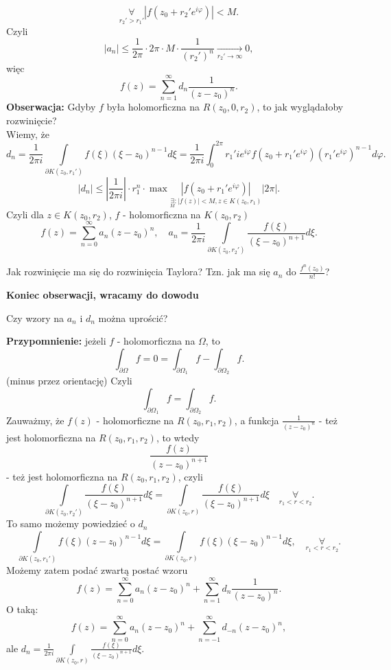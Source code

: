 \documentclass[../main.tex]{subfiles}
\begin{document}
\[
    \underset{r_2' > r_1'}{\forall} \left| f(z_0+r_2'e^{i\varphi}) \right| < M
.\]
Czyli
\[
    |a_n| \le \frac{1}{2\pi} \cdot 2\pi \cdot M \cdot \frac{1}{(r_2')^n} \underset{r_2'\to \infty}{\longrightarrow} 0
,\]
więc
\[
    f(z) = \sum_{n=1}^{\infty} d_n \frac{1}{(z-z_0)^n}
.\]
\textbf{Obserwacja:} Gdyby $f$ była holomorficzna na $R(z_0,0,r_2)$, to jak wyglądałoby rozwinięcie?\\
Wiemy, że
\[
    d_n = \frac{1}{2\pi i}\int\limits_{ \partial K(z_0,r_1')} f(\xi)(\xi - z_0)^{n-1}d\xi = \frac{1}{2\pi i}\int_{0}^{2\pi} r_1'ie^{i\varphi}f(z_0+r_1'e^{i\varphi})(r_1'e^{i\varphi})^{n-1}d\varphi
.\]
\[
    |d_n| \le \left| \frac{1}{2\pi i} \right| \cdot r_1^{n} \cdot  \max \underset{\underset{M}{\exists}: |f(z)| < M, z\in K(z_0,r_1)}{\left| f(z_0 + r_1'e^{i\varphi}) \right| }|2\pi|
.\]
Czyli dla $z\in K(z_0,r_2)$, $f$ - holomorficzna na $K(z_0,r_2)$
\[
    f(z) = \sum_{n=0}^{\infty} a_n (z-z_0)^n,\quad a_n = \frac{1}{2\pi i} \int\limits_{\partial K(z_0,r_2')} \frac{f(\xi)}{(\xi - z_0)^{n+1}}d\xi
.\]
\begin{pytanie}
    Jak rozwinięcie ma się do rozwinięcia Taylora? Tzn. jak ma się $a_n$ do $\frac{f^n(z_0)}{n!}$?
\end{pytanie}
\textbf{Koniec obserwacji, wracamy do dowodu}

\begin{pytanie}
    Czy wzory na $a_n$ i $d_n$ można uprościć?
\end{pytanie}
\textbf{Przypomnienie:} jeżeli $f$ - holomorficzna na $\Omega$, to
\[
\int_{\partial \Omega} f = 0 = \int_{\partial \Omega_1}f - \int_{\partial \Omega_2}f
.\]
(minus przez orientację) Czyli
\[
\int_{\partial \Omega_1}f = \int_{\partial \Omega_2}f
.\]
Zauważmy, że $f(z)$ - holomorficzne na $R(z_0,r_1,r_2)$, a funkcja $\frac{1}{(z-z_0)^n}$ - też jest holomorficzna na $R(z_0,r_1,r_2)$, to wtedy \[
    \frac{f(z)}{(z-z_0)^{n+1}}
\]
 - też jest holomorficzna na $R(z_0,r_1,r_2)$, czyli
 \[
     \int\limits_{\partial K(z_0,r_2')} \frac{f(\xi)}{(\xi - z_0)^{n+1}}d\xi = \int\limits_{\partial K(z_0,r)} \frac{f(\xi)}{(\xi - z_0)^{n+1}}d\xi \quad\underset{r_1 < r < r_2}{\forall}
 .\]
 To samo możemy powiedzieć o $d_n$
  \[
      \int\limits_{\partial K(z_0,r_1')} f(\xi)(z-z_0)^{n-1} d\xi = \int\limits_{\partial K(z_0,r)} f(\xi)(\xi - z_0)^{n-1}d\xi,\quad \underset{r_1<r<r_2}{\forall}
 .\]
 Możemy zatem podać zwartą postać wzoru
 \[
     f(z) = \sum_{n=0}^{\infty} a_n (z-z_0)^n + \sum_{n=1}^{\infty} d_n \frac{1}{(z-z_0)^n}
 .\]
 O taką:
 \[
     f(z) = \sum_{n=0}^{\infty} a_n (z-z_0)^n + \sum_{n=-1}^{\infty} d_{-n}(z-z_0)^n
 ,\]
 ale $d_n = \frac{1}{2\pi i}\int\limits_{\partial K(z_0,r)} \frac{f(\xi)}{(\xi - z_0)^{n+1}}d\xi$.
\end{document}
